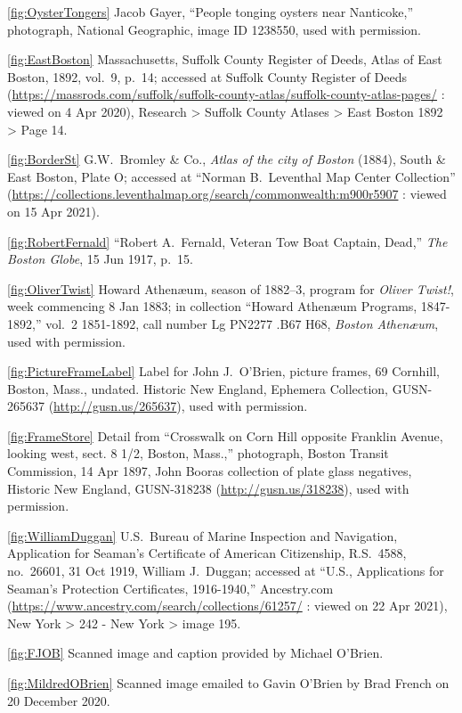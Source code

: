 \ref{fig:OysterTongers} Jacob Gayer, ``People tonging oysters near Nanticoke,'' photograph, National Geographic, image ID 1238550, used with permission.

\ref{fig:EastBoston} Massachusetts, Suffolk County Register of Deeds, Atlas of East Boston, 1892, vol.\ 9, p.\ 14; accessed at Suffolk County Register of Deeds (\url{https://massrods.com/suffolk/suffolk-county-atlas/suffolk-county-atlas-pages/} : viewed on 4 Apr 2020), Research > Suffolk County Atlases > East Boston 1892 > Page 14.

\ref{fig:BorderSt} G.W.\ Bromley \& Co., \textit{Atlas of the city of Boston} (1884), South \& East Boston, Plate O; accessed at ``Norman B.\ Leventhal Map Center Collection'' (\url{https://collections.leventhalmap.org/search/commonwealth:m900r5907} : viewed on 15 Apr 2021).

\ref{fig:RobertFernald} ``Robert A.\ Fernald, Veteran Tow Boat Captain, Dead,'' \textit{The Boston Globe}, 15 Jun 1917, p.\ 15.

\ref{fig:OliverTwist}
Howard Athen\ae um, season of 1882--3, program for \textit{Oliver Twist!}, week commencing 8 Jan 1883; in collection ``Howard Athen\ae um Programs, 1847-1892,'' vol.\ 2 1851-1892, call number Lg PN2277 .B67 H68, \textit{Boston Athen\ae um}, used with permission.

\ref{fig:PictureFrameLabel} Label for John J.\ O'Brien, picture frames, 69 Cornhill, Boston, Mass., undated. Historic New England, Ephemera Collection, GUSN-265637 (\url{http://gusn.us/265637}), used with permission.

\ref{fig:FrameStore} Detail from ``Crosswalk on Corn Hill opposite Franklin Avenue, looking west, sect. 8 1/2, Boston, Mass.,'' photograph, Boston Transit Commission, 14 Apr 1897, John Booras collection of plate glass negatives, Historic New England, GUSN-318238 (\url{http://gusn.us/318238}), used with permission. 

\ref{fig:WilliamDuggan} U.S.\ Bureau of Marine Inspection and Navigation, Application for Seaman's Certificate of American Citizenship, R.S.\ 4588, no.\ 26601, 31 Oct 1919, William J.\ Duggan; accessed at ``U.S., Applications for Seaman's Protection Certificates, 1916-1940,'' Ancestry.com (\url{https://www.ancestry.com/search/collections/61257/} : viewed on 22 Apr 2021), New York > 242 - New York > image 195.

\ref{fig:FJOB} Scanned image and caption provided by Michael O'Brien.

\ref{fig:MildredOBrien} Scanned image emailed to Gavin O'Brien by Brad French on 20 December 2020.

